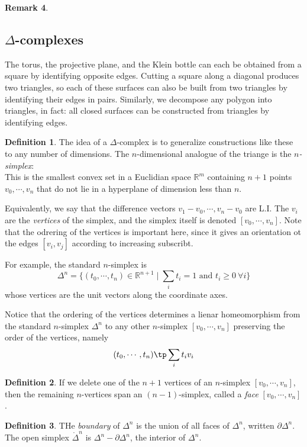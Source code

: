 \documentclass[11pt,a4paper]{article}
\theoremstyle{definition}
\newtheorem{definition}{Definition}[section]
\newtheorem{remark}[definition]{Remark}
\theoremstyle{plain}
\theoremstyle{remark}
\begin{document}
\begin{remark}
\subsection{$\Delta$-complexes} 

 The torus, the projective plane, and the Klein bottle 
can each be obtained from a square by identifying opposite edges. 
Cutting a square along a diagonal produces two triangles, so each of these surfaces can also be built from two 
triangles by identifying their edges in pairs. Similarly, we decompose any polygon into triangles, 
in fact: all closed surfaces can be constructed from triangles by identifying edges. 

\begin{definition}
  The idea of a $\Delta$-complex is to generalize constructions like these to any number of dimensions. The $n$-dimensional 
  analogue of the triange is the \emph{$n$-simplex}: \\
  This is the smallest convex set in a Euclidian space $\mathbb{R}^m$ containing $n+1$ points $v_0, \cdots, v_n$ 
  that do not lie in a hyperplane of dimension less than $n$.

  Equivalently, we say that the difference vectors $v_1 - v_0, \cdots, v_n - v_0$ are L.I.
  The $v_i$ are the \emph{vertices} of the simplex, and the simplex itself is denoted $[v_0, \cdots, v_n]$. 
  Note that the odrering of the vertices is important here, since it gives an orientation ot the edges $[v_i, v_j]$ according 
  to increasing subscribt. 
\end{definition}

For example, the standard $n$-simplex is 
$$ \Delta^n = \{(t_0, \cdots, t_n) \in \mathbb{R}^{n+1} \mid \sum_i t_i = 1 \text{ and } t_i \geq 0 \ \forall i\}$$
whose vertices are the unit vectors along the coordinate axes. 

Notice that the ordering of the vertices determines a lienar homeomorphism from the standard $n$-simplex 
$\Delta^n$ to any other $n$-simplex $[v_0, \cdots, v_n]$ preserving the order of the vertices, namely 
$$(t_0, \cdots, t_n) \tp \sum_i t_i v_i$$

\begin{definition}
  If we delete one of the $n+1$ vertices of an $n$-simplex $[v_0, \cdots, v_n]$, then the remaining 
  $n$-vertices span an $(n-1)$-simplex, called a \emph{face} $[v_0, \cdots, v_n]$. 
\end{definition}

\begin{definition}
  THe \emph{boundary} of $\Delta^n$ is the union of all faces of $\Delta^n$, written $\partial \Delta^n$. 
  The open simplex $\mathring{\Delta}^n$ is $\Delta^n - \partial \Delta^n$, the interior of $\Delta^n$.
\end{definition}


\end{remark}
\end{document}
